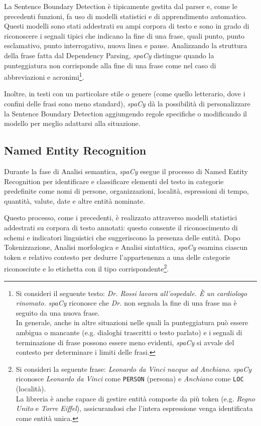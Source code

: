 \documentclass[12pt]{report}
\newcommand{\spacy}{\textsl{spaCy}\xspace}
\begin{document}
La Sentence Boundary Detection è tipicamente gestita dal parser e, come le precedenti funzioni, fa uso di modelli statistici e di apprendimento automatico. Questi modelli sono stati addestrati su ampi corpora di testo e sono in grado di riconoscere i segnali tipici che indicano la fine di una frase, quali punto, punto esclamativo, punto interrogativo, nuova linea e pause. Analizzando la struttura della frase fatta dal Dependency Parsing, \spacy distingue quando la punteggiatura non corrisponde alla fine di una frase come nel caso di abbreviazioni e acronimi\footnote{Si consideri il seguente testo: \textit{Dr. Rossi lavora all'ospedale. È un cardiologo rinomato.} \spacy riconosce che \textit{Dr.} non segnala la fine di una frase ma è seguito da una nuova frase.\\
In generale, anche in altre situazioni nelle quali la punteggiatura può essere ambigua o mancante (e.g. dialoghi trascritti o testo parlato) e i segnali di terminazione di frase possono essere meno evidenti, \spacy si avvale del contesto per determinare i limiti delle frasi.}.

Inoltre, in testi con un particolare stile o genere (come quello letterario, dove i confini delle frasi sono meno standard), \spacy dà la possibilità di personalizzare la Sentence Boundary Detection aggiungendo regole specifiche o modificando il modello per meglio adattarsi alla situazione.


\subsection{Named Entity Recognition}
Durante la fase di \textsf{Analisi semantica}, \spacy esegue il processo di Named Entity Recognition per identificare e classificare elementi del testo in categorie predefinite come nomi di persone, organizzazioni, località, espressioni di tempo, quantità, valute, date e altre entità nominate.

Questo processo, come i precedenti, è realizzato attraverso modelli statistici addestrati su corpora di testo annotati: questo consente il riconoscimento di schemi e indicatori linguistici che suggeriscono la presenza delle entità. Dopo \textsf{Tokenizzazione}, \textsf{Analisi morfologica} e \textsf{Analisi sintattica}, \spacy  esamina ciascun token e relativo contesto per dedurre l'appartenenza a una delle categorie riconosciute e lo etichetta con il tipo corrispondente\footnote{Si consideri la seguente frase: \textit{Leonardo da Vinci nacque ad Anchiano}. \spacy riconosce \textit{Leonardo da Vinci} come \texttt{PERSON} (persona) e \textit{Anchiano} come \texttt{LOC} (località).\\
La libreria è anche capace di gestire entità composte da più token (e.g. \textit{Regno Unito} e \textit{Torre Eiffel}), assicurandosi che l'intera espressione venga identificata come entità unica.}.
\end{document}

